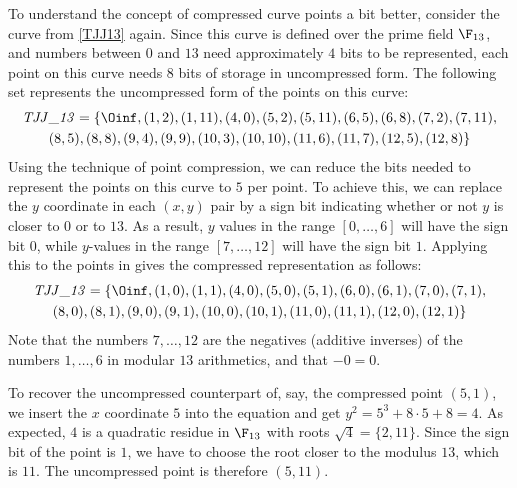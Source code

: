\begin{example} To understand the concept of compressed curve points a bit better, consider the \TJJ{} curve from \examplename{} \ref{TJJ13} again. Since this curve is defined over the prime field $\F_{13}$, and numbers between $0$ and $13$ need approximately $4$ bits to be represented, each \TJJ{} point on this curve needs $8$ bits of storage in uncompressed form. The following set represents the uncompressed form of the points on this curve:
\begin{multline}
\mathit{TJJ\_13} = \{\Oinf, (1, 2), (1, 11), (4, 0), (5, 2), (5, 11), (6, 5), (6, 8), (7,2), (7, 11), \\ (8, 5), (8, 8), (9, 4), (9, 9), (10, 3), (10,
10), (11, 6), (11, 7), (12, 5), (12, 8)\}
\end{multline}
Using the technique of point compression, we can reduce the bits needed to represent the points on this curve to  $5$ per point. To achieve this, we can replace the $y$ coordinate in each $(x,y)$ pair by a sign bit indicating whether or not $y$ is closer to $0$ or to $13$. As a result, $y$ values in the range $[0,\ldots,6]$ will have the sign bit $0$, while $y$-values in the range $[7,\ldots,12]$ will have the sign bit $1$. Applying this to the points in \TJJ{} gives the compressed representation as follows:
\begin{multline}
\mathit{TJJ\_13} = \{\Oinf, (1, 0), (1, 1), (4, 0), (5, 0), (5, 1), (6, 0), (6, 1), (7,0), (7, 1), \\ (8, 0), (8, 1), (9, 0), (9, 1), (10, 0), (10,1), (11, 0), (11, 1), (12, 0), (12, 1)\}
\end{multline} 
Note that the numbers $7,\ldots, 12$ are the negatives (additive inverses) of the numbers $1,\ldots, 6$ in modular $13$ arithmetics, and that $-0=0$.

To recover the uncompressed counterpart of, say, the compressed point $(5,1)$, we insert the $x$ coordinate $5$ into the  equation and get $y^2 = 5^3 + 8\cdot 5 +8 = 4$. As expected, $4$ is a quadratic residue in $\F_{13}$ with roots $\sqrt{4}= \{2,11\}$. Since the sign bit of the point is $1$, we have to choose the root closer to the modulus $13$, which is $11$. The uncompressed point is therefore $(5,11)$. 
\end{example}
